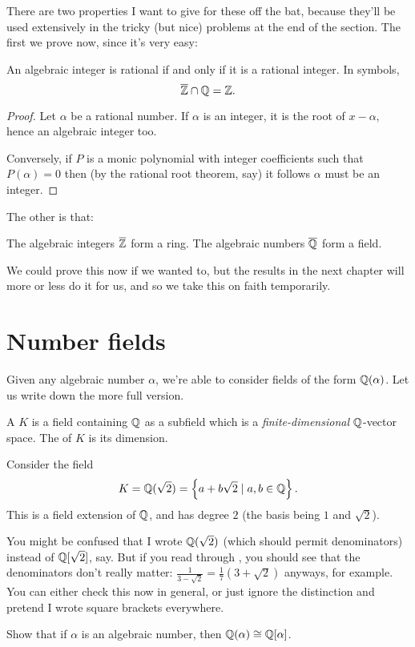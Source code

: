 There are two properties I want to give
for these off the bat,
because they'll be used extensively in the tricky
(but nice) problems at the end of the section.
The first we prove now, since it's very easy:
\begin{proposition}
	An algebraic integer is rational
	if and only if it is a rational integer.
	In symbols, \[ \overline{\mathbb Z} \cap \mathbb Q = \mathbb Z. \]
\end{proposition}
\begin{proof}
	Let $\alpha$ be a rational number.
	If $\alpha$ is an integer, it is the root of $x-\alpha$,
	hence an algebraic integer too.

	Conversely, if $P$ is a monic polynomial with integer
	coefficients such that $P(\alpha) = 0$ then
	(by the rational root theorem, say)
	it follows $\alpha$ must be an integer.
\end{proof}
The other is that:
\begin{proposition}
	The algebraic integers $\overline{\mathbb Z}$ form a ring.
	The algebraic numbers $\overline{\mathbb Q}$ form a field.
\end{proposition}
We could prove this now if we wanted to,
but the results in the next chapter will more or less
do it for us, and so we take this on faith temporarily.

\section{Number fields}

Given any algebraic number $\alpha$,
we're able to consider fields of the form $\mathbb Q(\alpha)$.
Let us write down the more full version.

\begin{definition}
	A  $K$ is a field containing $\mathbb Q$ as a subfield
	which is a \emph{finite-dimensional} $\mathbb Q$-vector space.
	The  of $K$ is its dimension.
\end{definition}
\begin{example}
	Consider the field
	\[ K = \mathbb Q(\sqrt2) = \left\{ a+b\sqrt2 \mid a,b \in \mathbb Q \right\}. \]
	This is a field extension of $\mathbb Q$,
	and has degree $2$ (the basis being $1$ and $\sqrt2$).
\end{example}

You might be confused that I wrote $\mathbb Q(\sqrt2)$
(which should permit denominators) instead of $\mathbb Q[\sqrt2]$, say.
But if you read through ,
you should see that the denominators don't really matter:
$\frac{1}{3-\sqrt2} = \frac17(3+\sqrt2)$ anyways, for example.
You can either check this now in general,
or just ignore the distinction and pretend I wrote square brackets everywhere.
\begin{exercise}
	[Unimportant]
	Show that if $\alpha$ is an algebraic number,
	then $\mathbb Q(\alpha) \cong \mathbb Q[\alpha]$.
\end{exercise}

